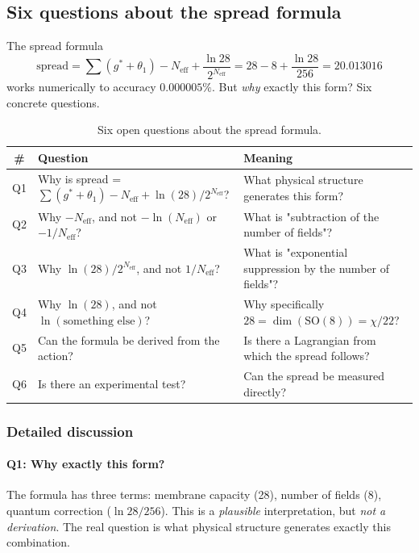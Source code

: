 \documentclass[11pt,a4paper]{article}
\newcommand{\SO}{\ensuremath{\mathrm{SO}}}
\theoremstyle{definition}
\begin{document}
\subsection{Six questions about the spread formula}
\label{subsec:open-spread-questions}

The spread formula
\begin{equation}
    \text{spread} = \sum(g^* + \theta_1) - N_{\text{eff}}
    + \frac{\ln 28}{2^{N_{\text{eff}}}}
    = 28 - 8 + \frac{\ln 28}{256} = 20.013016
\end{equation}
works numerically to accuracy $0.000005\%$. But \emph{why}
exactly this form? Six concrete questions.

\begin{table}[ht]
\centering
\caption{Six open questions about the spread formula.}
\label{tab:six-questions}
\begin{tabular}{clp{6cm}}
\toprule
\# & Question & Meaning \\
\midrule
Q1 & Why is spread = $\sum(g^* + \theta_1) - N_{\text{eff}}
    + \ln(28)/2^{N_{\text{eff}}}$?
   & What physical structure generates this form? \\[0.3em]
Q2 & Why $- N_{\text{eff}}$, and not $-\ln(N_{\text{eff}})$
    or $- 1/N_{\text{eff}}$?
   & What is "subtraction of the number of fields"? \\[0.3em]
Q3 & Why $\ln(28)/2^{N_{\text{eff}}}$, and not $1/N_{\text{eff}}$?
   & What is "exponential suppression by the number of fields"? \\[0.3em]
Q4 & Why $\ln(28)$, and not $\ln(\text{something else})$?
   & Why specifically $28 = \dim(\SO(8)) = \chi/22$? \\[0.3em]
Q5 & Can the formula be derived from the action?
   & Is there a Lagrangian from which the spread follows? \\[0.3em]
Q6 & Is there an experimental test?
   & Can the spread be measured directly? \\
\bottomrule
\end{tabular}
\end{table}

\subsubsection{Detailed discussion}

\paragraph{Q1: Why exactly this form?}
The formula has three terms: membrane capacity (28),
number of fields (8), quantum correction ($\ln 28/256$).
This is a \emph{plausible} interpretation, but \emph{not a derivation}.
The real question is what physical structure generates
exactly this combination.
\end{document}
